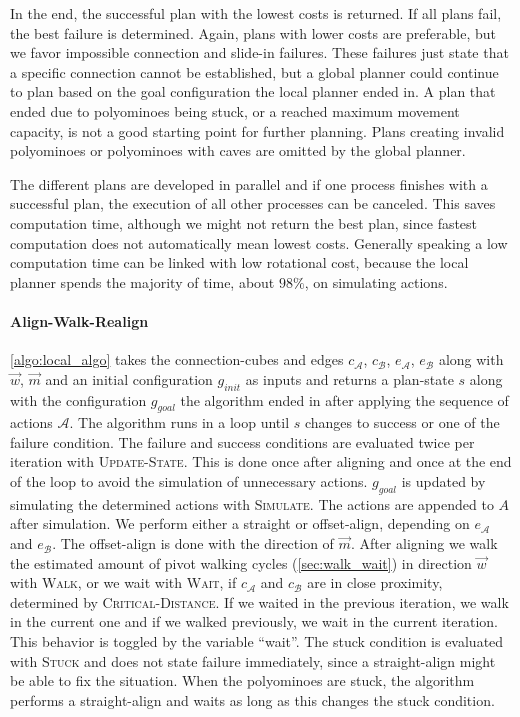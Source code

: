 In the end, the successful plan with the lowest costs is returned.
If all plans fail, the best failure is determined.
Again, plans with lower costs are preferable, but we favor impossible connection and slide-in failures.
These failures just state that a specific connection cannot be established, but a global planner could continue to plan based on the goal configuration the local planner ended in.
A plan that ended due to polyominoes being stuck, or a reached maximum movement capacity, is not a good starting point for further planning.
Plans creating invalid polyominoes or polyominoes with caves are omitted by the global planner.

The different plans are developed in parallel and if one process finishes with a successful plan, the execution of all other processes can be canceled.
This saves computation time, although we might not return the best plan, since fastest computation does not automatically mean lowest costs.
Generally speaking a low computation time can be linked with low rotational cost, because the local planner spends the majority of time, about $98\%$, on simulating actions.

\paragraph{Align-Walk-Realign}

\autoref{algo:local_algo} takes the connection-cubes and edges $c_\mathcal{A}$, $c_\mathcal{B}$, $e_\mathcal{A}$, $e_\mathcal{B}$ along with $\vec{w}$, $\vec{m}$ and an initial configuration $g_\textit{init}$ as inputs and returns a plan-state $s$ along with the configuration $g_\textit{goal}$ the algorithm ended in after applying the sequence of actions $\mathcal{A}$.
The algorithm runs in a loop until $s$ changes to success or one of the failure condition.
The failure and success conditions are evaluated twice per iteration with {\scshape Update-State}.
This is done once after aligning and once at the end of the loop to avoid the simulation of unnecessary actions.
$g_\textit{goal}$ is updated by simulating the determined actions with {\scshape Simulate}.
The actions are appended to $A$ after simulation.
We perform either a straight or offset-align, depending on $e_\mathcal{A}$ and $e_\mathcal{B}$.
The offset-align is done with the direction of $\vec{m}$.
After aligning we walk the estimated amount of pivot walking cycles (\autoref{sec:walk_wait}) in direction $\vec{w}$ with {\scshape Walk}, or we wait with {\scshape Wait}, if $c_\mathcal{A}$ and $c_\mathcal{B}$ are in close proximity, determined by {\scshape Critical-Distance}.
If we waited in the previous iteration, we walk in the current one and if we walked previously, we wait in the current iteration.
This behavior is toggled by the variable ``wait''. 
The stuck condition is evaluated with {\scshape Stuck} and does not state failure immediately, since a straight-align might be able to fix the situation.
When the polyominoes are stuck, the algorithm performs a straight-align and waits as long as this changes the stuck condition.

